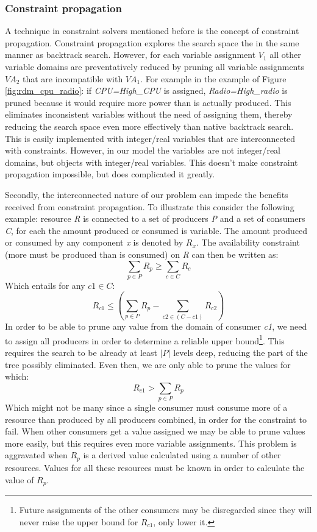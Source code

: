 \subsubsection{Constraint propagation}
A technique in constraint solvers mentioned before is the concept of constraint propagation. Constraint propagation explores the search space the in the same manner as backtrack search. However, for each variable assignment $V_1$ all other variable domains are preventatively reduced by pruning all variable assignments $VA_2$ that are incompatible with $VA_1$. For example in the example of Figure \ref{fig:rdm_cpu_radio}: if \emph{CPU=High\_CPU} is assigned, \emph{Radio=High\_radio} is pruned because it would require more power than is actually produced. This eliminates inconsistent variables without the need of assigning them, thereby reducing the search space even more effectively than native backtrack search. This is easily implemented with integer/real variables that are interconnected with constraints. However, in our model the variables are not integer/real domains, but objects with integer/real variables. This doesn't make constraint propagation impossible, but does complicated it greatly.

Secondly, the interconnected nature of our problem can impede the benefits received from constraint propagation. To illustrate this consider the following example: resource \emph{R} is connected to a set of producers \emph{P} and a set of consumers \emph{C}, for each the amount produced or consumed is variable. The amount produced or consumed by any component \emph{x} is denoted by $R_x$. The availability constraint (more must be produced than is consumed) on \emph{R} can then be written as:
$$\sum_{p \in P}R_p \geq \sum_{c \in C}R_c$$
Which entails for any $c1 \in C$: 
$$R_{c1} \leq \left(\sum_{p \in P} R_p - \sum_{c2 \in (C-c1)} R_{c2}\right)$$
In order to be able to prune any value from the domain of consumer \emph{c1}, we need to assign all producers in order to determine a reliable upper bound\footnote{Future assignments of the other consumers may be disregarded since they will never raise the upper bound for $R_{c1}$, only lower it.}. This requires the search to be already at least $|P|$ levels deep, reducing the part of the tree possibly eliminated. Even then, we are only able to prune the values for which:
$$R_{c1} > \sum_{p \in P} R_p$$
Which might not be many since a single consumer must consume more of a resource than produced by all producers combined, in order for the constraint to fail. When other consumers get a value assigned we may be able to prune values more easily, but this requires even more variable assignments. This problem is aggravated when $R_p$ is a derived value calculated using a number of other resources. Values for all these resources must be known in order to calculate the value of $R_p$.

